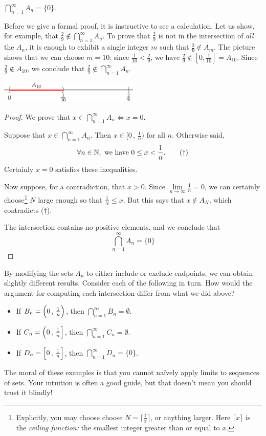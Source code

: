 \begin{thm}{}{}
	$\bigcap\limits_{n=1}^\infty A_n=\{0\}$.
\end{thm}

Before we give a formal proof, it is instructive to see a calculation. Let us show, for example, that $\frac 29\not\in\bigcap\limits_{n=1}^\infty A_n$. To prove that $\frac 29$ is not in the intersection of \emph{all} the $A_n$, it is enough to exhibit a single integer $m$ such that $\frac 29\not\in A_m$. The picture shows that we can choose $m=10$: since $\frac 1{10}<\frac 29$, we have $\frac 29\not\in [0,\frac 1{10}]=A_{10}$. Since $\frac 29\not\in A_{10}$, we conclude that $\frac 29\not\in\bigcap\limits_{n=1}^\infty A_n$.
\begin{center}
	\includegraphics[width=0.5\textwidth]{setsii-06-intervalex}
\end{center}

\begin{proof}
	We prove that $x\in\bigcap\limits_{n=1}^\infty A_n\iff x=0$.\par
	Suppose that $x\in\bigcap\limits_{n=1}^\infty A_n$. Then $x\in\bigl[0\,,\,\frac 1n\bigr)$ for all $n$. Otherwise said,
	\[
		\forall n\in\mathbb{N},\text{ we have }0\le x<\frac 1n.\tag{$\dag$}
	\]
	Certainly $x=0$ satisfies these inequalities.\par
	Now suppose, for a contradiction, that $x>0$. Since $\lim\limits_{n\to\infty}\frac 1n=0$, we can certainly choose\footnote{Explicitly, you may choose choose $N=\lceil\frac 1x\rceil$, or anything larger. Here $\lceil x\rceil$ is the \emph{ceiling function:} the smallest integer greater than or equal to $x$.} $N$ large enough so that $\frac 1N\le x$. But this says that $x\not\in A_N$, which contradicts ($\dag$).\par
	The intersection contains no positive elements, and we conclude that
	\[
		\bigcap\limits_{n=1}^\infty A_n=\{0\}\tag*{\qedhere}
	\]
\end{proof}

By modifying the sets $A_n$ to either include or exclude endpoints, we can obtain slightly different results. Consider each of the following in turn. How would the argument for computing each intersection differ from what we did above?
\begin{itemize}
  \item If $B_n=\Bigl(0\,,\,\frac 1n\Bigr)$, then $\bigcap\limits_{n=1}^\infty B_n=\emptyset$.
  \item If $C_n=\Bigl(0\,,\,\frac 1n\Bigr]$, then $\bigcap\limits_{n=1}^\infty C_n=\emptyset$.
  \item If $D_n=\Bigl[0\,,\,\frac 1n\Bigr]$, then $\bigcap\limits_{n=1}^\infty D_n=\{0\}$.
\end{itemize}
The moral of these examples is that you cannot naïvely apply limits to sequences of sets. Your intuition is often a good guide, but that doesn't mean you should trust it blindly!\par

